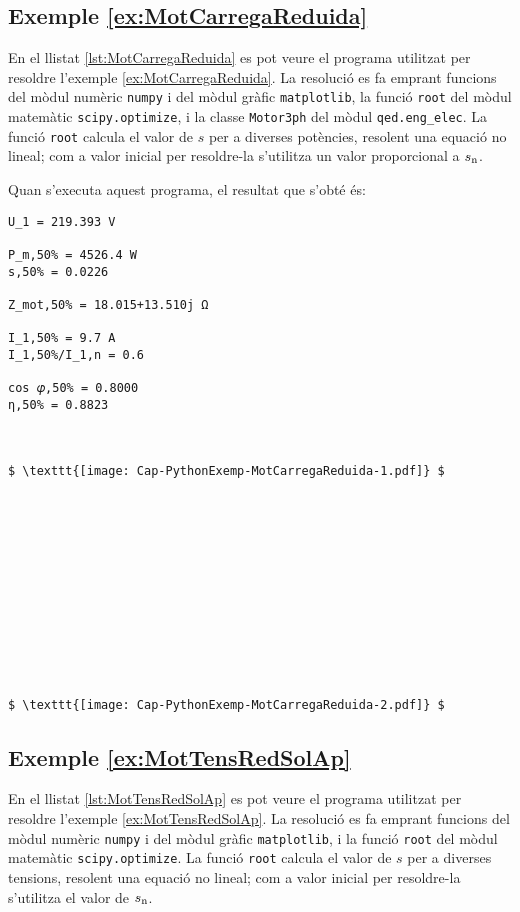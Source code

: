 \hypertarget{exemple:MotCarregaReduida}{\subsection{Exemple \ref*{ex:MotCarregaReduida} \MotCarregaReduida}}
En el llistat \vref{lst:MotCarregaReduida} es pot veure el programa utilitzat per resoldre l'exemple \vref{ex:MotCarregaReduida}. La resolució es fa emprant funcions del mòdul numèric \texttt{numpy} i del mòdul gràfic \texttt{matplotlib}, la funció \texttt{root} del mòdul matemàtic \texttt{scipy.optimize}, i la classe \texttt{Motor3ph} del mòdul \texttt{qed.eng\_elec}. La funció \texttt{root} calcula el valor de $s$ per a diverses potències, resolent una equació no lineal; com a valor inicial per resoldre-la  s'utilitza un valor proporcional a $s_\mathrm{n}$.


Quan s'executa aquest programa, el resultat que s'obté és:
\lstset{
	language=,
	numbers=none,
	frame=none
}
\begin{lstlisting}[mathescape=true]
U_1 = 219.393 V

P_m,50% = 4526.4 W
s,50% = 0.0226

Z_mot,50% = 18.015+13.510j Ω

I_1,50% = 9.7 A
I_1,50%/I_1,n = 0.6

cos 𝜑,50% = 0.8000
η,50% = 0.8823



$ \texttt{[image: Cap-PythonExemp-MotCarregaReduida-1.pdf]} $













$ \texttt{[image: Cap-PythonExemp-MotCarregaReduida-2.pdf]} $
\end{lstlisting} 


\hypertarget{exemple:MotTensRedSolAp}{\subsection{Exemple \ref*{ex:MotTensRedSolAp} \MotTensRedSolAp}}
En el llistat \vref{lst:MotTensRedSolAp} es pot veure el programa utilitzat per resoldre l'exemple \vref{ex:MotTensRedSolAp}. La resolució es fa emprant funcions del mòdul numèric \texttt{numpy} i del mòdul gràfic \texttt{matplotlib}, i la funció \texttt{root} del mòdul matemàtic \texttt{scipy.optimize}. La funció \texttt{root} calcula el valor de $s$ per a diverses tensions, resolent una equació no lineal; com a valor inicial per resoldre-la  s'utilitza el valor de $s_\mathrm{n}$.


